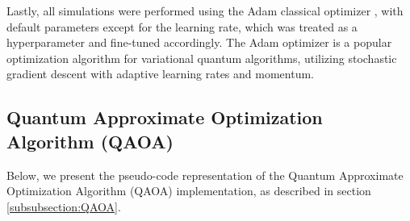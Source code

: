 Lastly, all simulations were performed using the Adam classical optimizer \cite{kingma2017adam}, with default parameters except for the learning rate, which was treated as a hyperparameter and fine-tuned accordingly. The Adam optimizer is a popular optimization algorithm for variational quantum algorithms, utilizing stochastic gradient descent with adaptive learning rates and momentum.



\subsection{Quantum Approximate Optimization Algorithm (QAOA)}
\label{subsection:QAOA_Implementation}


Below, we present the pseudo-code representation of the Quantum Approximate Optimization Algorithm (QAOA) implementation, as described in section \ref{subsubsection:QAOA}.

